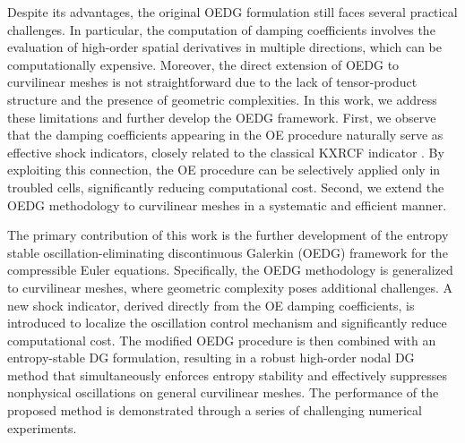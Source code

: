 \documentclass[fleqn,11pt]{amsart}
\begin{document}
Despite its advantages, the original OEDG formulation still faces several practical challenges. In particular, the computation of damping coefficients involves the evaluation of high-order spatial derivatives in multiple directions, which can be computationally expensive.
Moreover, the direct extension of OEDG to curvilinear meshes is not straightforward due to the lack of tensor-product structure and the presence of geometric complexities.
In this work, we address these limitations and further develop the OEDG framework. First, we observe that the damping coefficients appearing in the OE procedure naturally serve as effective shock indicators, closely related to the classical KXRCF indicator \cite{krivodonova2004shock}. By exploiting this connection, the OE procedure can be selectively applied
only in troubled cells, significantly reducing computational cost. Second, we extend the OEDG methodology to curvilinear meshes in a systematic and efficient manner. 




The primary contribution of this work is the further development of the entropy stable oscillation-eliminating discontinuous Galerkin (OEDG) framework for the compressible Euler equations.
Specifically, the OEDG methodology is generalized to curvilinear meshes, where geometric complexity poses additional challenges.
A new shock indicator, derived directly from the OE damping coefficients, is introduced to localize the oscillation control mechanism and significantly
reduce computational cost.
The modified OEDG procedure is then combined with an entropy-stable DG formulation, resulting in a robust high-order nodal DG method that simultaneously enforces entropy stability and effectively suppresses nonphysical oscillations on general curvilinear meshes.
The performance of the proposed method is demonstrated through a series of challenging numerical experiments.
\end{document}
